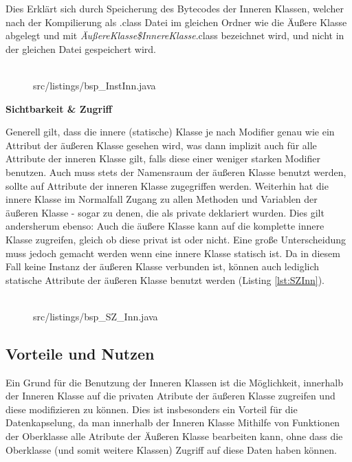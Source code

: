 Dies Erklärt sich durch Speicherung des Bytecodes der Inneren Klassen, welcher nach der Kompilierung als .class Datei im gleichen Ordner wie die Äußere Klasse abgelegt und mit {\it ÄußereKlasse\$InnereKlasse}.class bezeichnet wird, und nicht in der gleichen Datei gespeichert wird.
\\
\\
\begin{figure}[hbt]
\lstset{language=Java}
 {src/listings/bsp_InstInn.java}
\end{figure}


{\bf Sichtbarkeit \& Zugriff}

Generell gilt, dass die innere (statische) Klasse je nach Modifier genau wie ein Attribut der äußeren Klasse gesehen wird, was dann implizit auch für alle Attribute der inneren Klasse gilt, falls diese einer weniger starken Modifier benutzen.
Auch muss stets der Namensraum der äußeren Klasse benutzt werden, sollte auf Attribute der inneren Klasse zugegriffen werden.
Weiterhin hat die innere Klasse im Normalfall Zugang zu allen Methoden und Variablen der äußeren Klasse - sogar zu denen, die als private deklariert wurden.
Dies gilt andersherum ebenso: Auch die äußere Klasse kann auf die komplette innere Klasse zugreifen, gleich ob diese privat ist oder nicht.
Eine große Unterscheidung muss jedoch gemacht werden wenn eine innere Klasse statisch ist. Da in diesem Fall keine Instanz der äußeren Klasse verbunden ist, können auch lediglich statische Attribute der äußeren Klasse benutzt werden (Listing \ref{lst:SZInn}).
\\
\\
\begin{figure}[hbt]
\lstset{language=Java}
 {src/listings/bsp_SZ_Inn.java}
\end{figure}

\newpage

\subsection{Vorteile und Nutzen}

Ein Grund für die Benutzung der Inneren Klassen ist die Möglichkeit, innerhalb der Inneren Klasse auf die privaten Atribute der äußeren Klasse zugreifen und diese modifizieren zu können.
Dies ist insbesonders ein Vorteil für die Datenkapselung, da man innerhalb der Inneren Klasse Mithilfe von Funktionen der Oberklasse alle Atribute der Äußeren Klasse bearbeiten kann, ohne dass die Oberklasse (und somit weitere Klassen) Zugriff auf diese Daten haben können.

